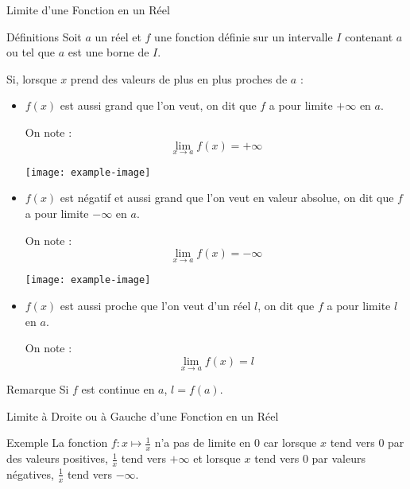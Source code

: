 \documentclass{cours}
\begin{document}
    \begin{Gpartie}{Limite d'une Fonction en un Réel} 
        \begin{Spartie}{Définitions} 
            Soit $a$ un réel et $f$ une fonction définie sur un intervalle $I$ contenant $a$ ou tel que $a$ est une borne de $I$.

            Si, lorsque $x$ prend des valeurs de plus en plus proches de $a$ :
            \begin{itemize}
                \item $f(x)$ est aussi grand que l'on veut, on dit que $f$ a pour limite $+\infty$ en $a$.

                On note : \[\lim\limits_{x\to a}f(x)=+\infty\]
                \begin{center}
                        \texttt{[image: example-image]}
                    \parbox{\linewidth}{}
                \end{center}
                \vspace*{2ex}
                \item $f(x)$ est négatif et aussi grand que l'on veut en valeur absolue, on dit que $f$ a pour limite $-\infty$ en $a$.

                On note : \[\lim\limits_{x\to a}f(x)=-\infty\]
                \begin{center}
                        \texttt{[image: example-image]}
                    \parbox{\linewidth}{}
                \end{center}
                \vspace*{2ex}
                \item $f(x)$ est aussi proche que l'on veut d'un réel $l$, on dit que $f$ a pour limite $l$ en $a$.
                
                On note : \[\lim\limits_{x\to a}f(x)=l\]
            \end{itemize}
            \begin{SSpartie}{Remarque} 
                Si $f$ est continue en $a$, $l=f(a)$.
            \end{SSpartie}
        \end{Spartie}
        \begin{Spartie}{Limite à Droite ou à Gauche d'une Fonction en un Réel} 
            \begin{SSpartie}{Exemple} 
                La fonction $f:x\mapsto\frac{1}{x}$ n'a pas de limite en $0$ car lorsque $x$ tend vers $0$ par des valeurs positives, $\frac{1}{x}$ tend vers $+\infty$ et lorsque $x$ tend vers $0$ par valeurs négatives, $\frac{1}{x}$ tend vers $-\infty$.


\end{SSpartie}
\end{Spartie}
\end{Gpartie}
\end{document}

